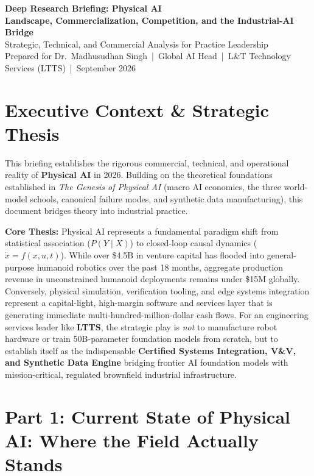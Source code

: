 \documentclass[11pt,a4paper]{article}
\begin{document}
\begin{center}
{\LARGE\bfseries\color{darkprimary} Deep Research Briefing: Physical AI}\\[5pt]
{\large\color{textdark}\textbf{Landscape, Commercialization, Competition, and the Industrial-AI Bridge}}\\[3pt]
{\small\color{textgray} Strategic, Technical, and Commercial Analysis for Practice Leadership}\\[3pt]
{\small\color{textgray} Prepared for Dr.\ Madhusudhan Singh \,|\, Global AI Head \,|\, L\&T Technology Services (LTTS) \,|\, September 2026}
\end{center}

\vspace{0.2cm}

\section*{Executive Context \& Strategic Thesis}
This briefing establishes the rigorous commercial, technical, and operational reality of \textbf{Physical AI} in 2026. Building on the theoretical foundations established in \textit{The Genesis of Physical AI} (macro AI economics, the three world-model schools, canonical failure modes, and synthetic data manufacturing), this document bridges theory into industrial practice.

\textbf{Core Thesis:} Physical AI represents a fundamental paradigm shift from statistical association ($P(Y \mid X)$) to closed-loop causal dynamics ($\dot{x} = f(x,u,t)$). While over \$4.5B in venture capital has flooded into general-purpose humanoid robotics over the past 18 months, aggregate production revenue in unconstrained humanoid deployments remains under \$15M globally. Conversely, physical simulation, verification tooling, and edge systems integration represent a capital-light, high-margin software and services layer that is generating immediate multi-hundred-million-dollar cash flows. For an engineering services leader like \textbf{LTTS}, the strategic play is \textit{not} to manufacture robot hardware or train 50B-parameter foundation models from scratch, but to establish itself as the indispensable \textbf{Certified Systems Integration, V\&V, and Synthetic Data Engine} bridging frontier AI foundation models with mission-critical, regulated brownfield industrial infrastructure.

\section{Part 1: Current State of Physical AI: Where the Field Actually Stands}
\end{document}
